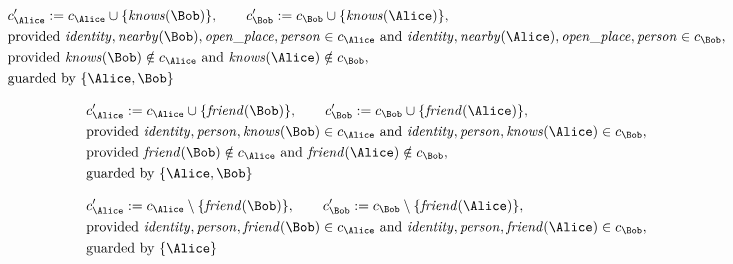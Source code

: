 \begin{align*}
&
c'_
{
\Alice
}
 := 
c_
{
\Alice
}
 \cup 
\{
\mathit{\detokenize{
knows
}}
(
\Bob
)
\}
, \qquad 
c'_
{
\Bob
}
 := 
c_
{
\Bob
}
 \cup 
\{
\mathit{\detokenize{
knows
}}
(
\Alice
)
\}
,\\
&
\text{provided } 
\mathit{\detokenize{
identity
}}
,
\mathit{\detokenize{
nearby
}}
(
\Bob
)
,
\mathit{\detokenize{
open_place
}}
,
\mathit{\detokenize{
person
}}
 \in c_
{
\Alice
}
 \text{ and } 
\mathit{\detokenize{
identity
}}
,
\mathit{\detokenize{
nearby
}}
(
\Alice
)
,
\mathit{\detokenize{
open_place
}}
,
\mathit{\detokenize{
person
}}
 \in c_
{
\Bob
}
,\\
&
\text{provided } 
\mathit{\detokenize{
knows
}}
(
\Bob
)
 \notin c_
{
\Alice
}
 \text{ and } 
\mathit{\detokenize{
knows
}}
(
\Alice
)
 \notin c_
{
\Bob
}
,\\
&
\text{guarded by } \{
\Alice
,
\Bob
\}
\end{align*}

\begin{align*}
&
c'_
{
\Alice
}
 := 
c_
{
\Alice
}
 \cup 
\{
\mathit{\detokenize{
friend
}}
(
\Bob
)
\}
, \qquad 
c'_
{
\Bob
}
 := 
c_
{
\Bob
}
 \cup 
\{
\mathit{\detokenize{
friend
}}
(
\Alice
)
\}
,\\
&
\text{provided } 
\mathit{\detokenize{
identity
}}
,
\mathit{\detokenize{
person
}}
,
\mathit{\detokenize{
knows
}}
(
\Bob
)
 \in c_
{
\Alice
}
 \text{ and } 
\mathit{\detokenize{
identity
}}
,
\mathit{\detokenize{
person
}}
,
\mathit{\detokenize{
knows
}}
(
\Alice
)
 \in c_
{
\Bob
}
,\\
&
\text{provided } 
\mathit{\detokenize{
friend
}}
(
\Bob
)
 \notin c_
{
\Alice
}
 \text{ and } 
\mathit{\detokenize{
friend
}}
(
\Alice
)
 \notin c_
{
\Bob
}
,\\
&
\text{guarded by } \{
\Alice
,
\Bob
\}
\end{align*}

\begin{align*}
&
c'_
{
\Alice
}
 := 
c_
{
\Alice
}
 \setminus 
\{
\mathit{\detokenize{
friend
}}
(
\Bob
)
\}
, \qquad 
c'_
{
\Bob
}
 := 
c_
{
\Bob
}
 \setminus 
\{
\mathit{\detokenize{
friend
}}
(
\Alice
)
\}
,\\
&
\text{provided } 
\mathit{\detokenize{
identity
}}
,
\mathit{\detokenize{
person
}}
,
\mathit{\detokenize{
friend
}}
(
\Bob
)
 \in c_
{
\Alice
}
 \text{ and } 
\mathit{\detokenize{
identity
}}
,
\mathit{\detokenize{
person
}}
,
\mathit{\detokenize{
friend
}}
(
\Alice
)
 \in c_
{
\Bob
}
,\\
&
\text{guarded by } \{
\Alice
\}
\end{align*}
